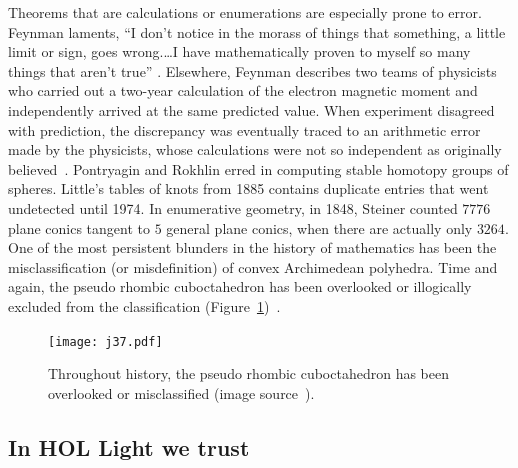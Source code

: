 \documentclass{llncs}
\begin{document}

Theorems that are calculations or enumerations are especially prone to
error.  Feynman laments, ``I don't notice in the morass of things that something, a
little limit or sign, goes wrong.\dots I have mathematically proven to myself
so many things that aren't true''
\cite[p.~885]{FeCo}. Elsewhere, Feynman describes two teams of
physicists who carried out a two-year calculation of the electron
magnetic moment and independently arrived at the same predicted value.
When experiment disagreed with prediction, the discrepancy was
eventually traced to an arithmetic error made by the physicists, whose
calculations were not so independent as originally
believed~\cite[p.~117]{FQED}.  Pontryagin and Rokhlin erred in
computing stable homotopy groups of spheres.  Little's tables of knots
from 1885 contains duplicate entries that went undetected until 1974.
In enumerative geometry, in 1848, Steiner counted $7776$ plane conics
tangent to $5$ general plane conics, when there are actually only
$3264$.  One of the most persistent blunders in the history of
mathematics has been the misclassification (or misdefinition) of
convex Archimedean polyhedra.  Time and again, the pseudo rhombic
cuboctahedron has been overlooked or illogically excluded from the
classification (Figure~\ref{fig:pseudo})~\cite{Gr11}.

\begin{figure}[h!]
  \centering
\texttt{[image: j37.pdf]}
\caption{Throughout history, the pseudo rhombic cuboctahedron has been
  overlooked or misclassified (image source~\cite{pseudo}).}
\label{fig:pseudo}
\end{figure}



\subsection{In HOL Light we trust}
\end{document}
